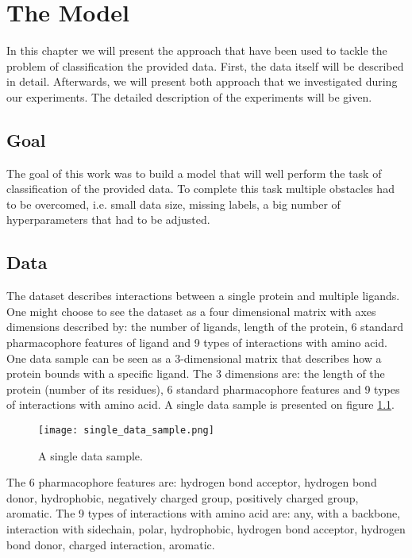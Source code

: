 \documentclass[a4paper,10pt]{report}
\begin{document}
	
  \chapter{The Model}\label{chap:OUR_MODEL}
     In this chapter we will present the approach that have been used to tackle the problem of classification the provided data. First, the data itself will be described in detail. Afterwards, we will present both approach that we investigated during our experiments. The detailed description of the experiments will be given.
      
      \section{Goal}
      The goal of this work was to build a model that will well perform the task of classification of the provided data. To complete this task multiple obstacles had to be overcomed, i.e. small data size, missing labels, a big number of hyperparameters that had to be adjusted. 
      
      \section{Data}\label{sec:OUR_DATA}
	The dataset describes interactions between a single protein and multiple ligands. One might choose to see the dataset as a four dimensional matrix with axes dimensions described by: the number of ligands, length of the protein, 6 standard pharmacophore features of ligand and 9 types of interactions with amino acid\cite{2DSIFT}. One data sample can be seen as a 3-dimensional matrix that describes how a protein bounds with a specific ligand. The 3 dimensions are: the length of the protein (number of its residues), 6 standard pharmacophore features and 9 types of interactions with amino acid. A single data sample is presented on figure \ref{fig:single_data_sample2}. 
	
	\begin{figure}[h!]
	  \centering
	  \texttt{[image: single\_data\_sample.png]}
	  \caption{A single data sample.}
	  \label{fig:single_data_sample2}
	\end{figure} 
	
	The 6 pharmacophore features are: hydrogen bond acceptor, hydrogen bond donor, hydrophobic, negatively charged group, positively charged group, aromatic. The 9 types of interactions with amino acid are: any, with a backbone, interaction with sidechain, polar, hydrophobic, hydrogen bond acceptor, hydrogen bond donor, charged interaction, aromatic. 
	
\end{document}

